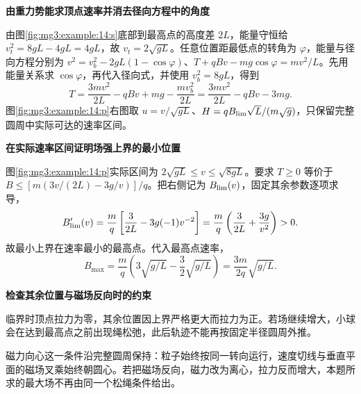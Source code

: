 \begin{solution}\textbf{由重力势能求顶点速率并消去径向方程中的角度}\par\nobreak
由图\ref{fig:mg3:example:14:s}底部到最高点的高度差 $2L$，能量守恒给 $v_t^2=8gL-4gL=4gL$，故 $v_t=2\sqrt{gL}$。任意位置距最低点的转角为 $\varphi$，能量与径向方程分别为 $v^2=v_b^2-2gL(1-\cos\varphi)$、$T+qBv-mg\cos\varphi=mv^2/L$。先用能量关系求 $\cos\varphi$，再代入径向式，并使用 $v_b^2=8gL$，得到\[T=\frac{3mv^2}{2L}-qBv+mg-\frac{mv_b^2}{2L}=\frac{3mv^2}{2L}-qBv-3mg.\]
图\ref{fig:mg3:example:14:p}右图取 $u=v/\sqrt{gL}$、$H=qB_{\rm lim}\sqrt L/(m\sqrt g)$，只保留完整圆周中实际可达的速率区间。




\par\medskip{}\noindent\textbf{在实际速率区间证明场强上界的最小位置}\par\nobreak
图\ref{fig:mg3:example:14:p}实际区间为 $2\sqrt{gL}\le v\le\sqrt{8gL}$。要求 $T\ge0$ 等价于 $B\le[m(3v/(2L)-3g/v)]/q$。把右侧记为 $B_{\rm lim}(v)$，固定其余参数逐项求导，
\[
 B_{\rm lim}'(v)=\frac mq\left[\frac{3}{2L}-3g(-1)v^{-2}\right]
 =\frac mq\left(\frac{3}{2L}+\frac{3g}{v^2}\right)>0.
\]
故最小上界在速率最小的最高点。代入最高点速率，
\[
B_{\max}=\frac mq\left(3\sqrt{g/L}-\frac32\sqrt{g/L}\right)
=\frac{3m}{2q}\sqrt{g/L}.
\]


\par\medskip{}\noindent\textbf{检查其余位置与磁场反向时的约束}\par\nobreak
临界时顶点拉力为零，其余位置因上界严格更大而拉力为正。若场继续增大，小球会在达到最高点之前出现绳松弛，此后轨迹不能再按固定半径圆周外推。

磁力向心这一条件沿完整圆周保持：粒子始终按同一转向运行，速度切线与垂直平面的磁场叉乘始终朝圆心。若把磁场反向，磁力改为离心，拉力反而增大，本题所求的最大场不再由同一个松绳条件给出。\end{solution}

